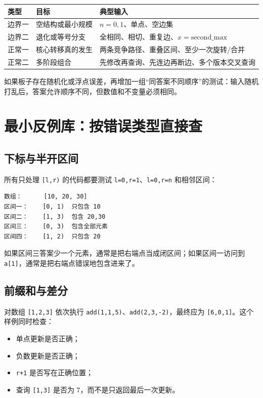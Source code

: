 \documentclass[UTF8,openany,oneside,zihao=-4]{ctexbook}
\begin{document}
\begin{center}
\begin{tabular}{p{}p{}p{}}
\hline
类型 & 目标 & 典型输入 \tabularnewline
\hline
边界一 & 空结构或最小规模 & $n=0,1$、单点、空边集 \tabularnewline
边界二 & 退化或等号分支 & 全相同、相切、重复边、$x=\text{second\_max}$ \tabularnewline
正常一 & 核心转移真的发生 & 两条竞争路径、重叠区间、至少一次旋转/合并 \tabularnewline
正常二 & 多阶段组合 & 先修改再查询、先连边再断边、多个版本交叉查询 \tabularnewline
\hline
\end{tabular}
\end{center}

如果板子存在随机化或浮点误差，再增加一组“同答案不同顺序”的测试：输入随机打乱后，答案允许顺序不同，但数值和不变量必须相同。

\section{最小反例库：按错误类型直接查}

\subsection{下标与半开区间}

所有只处理 \lstinline|[l,r)| 的代码都要测试 \lstinline|l=0,r=1|、\lstinline|l=0,r=n| 和相邻区间：

\begin{lstlisting}
数组：      [10, 20, 30]
区间一：    [0, 1)  只包含 10
区间二：    [1, 3)  包含 20,30
区间三：    [0, 3)  包含全部元素
区间四：    [1, 2)  只包含 20
\end{lstlisting}

如果区间三答案少一个元素，通常是把右端点当成闭区间；如果区间一访问到 \lstinline|a[1]|，通常是把右端点错误地包含进来了。

\subsection{前缀和与差分}

对数组 \lstinline|[1,2,3]| 依次执行 \lstinline|add(1,1,5)|、\lstinline|add(2,3,-2)|，最终应为 \lstinline|[6,0,1]|。这个样例同时检查：

\begin{itemize}
  \item 单点更新是否正确；
  \item 负数更新是否正确；
  \item \lstinline|r+1| 是否写在正确位置；
  \item 查询 \lstinline|[1,3]| 是否为 $7$，而不是只返回最后一次更新。
\end{itemize}
\end{document}
